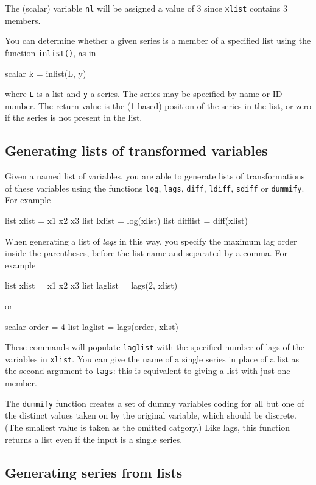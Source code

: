 The (scalar) variable \texttt{nl} will be assigned a value of 3 since
\texttt{xlist} contains 3 members.

You can determine whether a given series is a member of a specified
list using the function \texttt{inlist()}, as in
%
\begin{code}
scalar k = inlist(L, y)
\end{code}
%
where \texttt{L} is a list and \texttt{y} a series. The series may
be specified by name or ID number. The return value is the (1-based)
position of the series in the list, or zero if the series is not
present in the list. 

\subsection{Generating lists of transformed variables}

Given a named list of variables, you are able to generate lists of
transformations of these variables using the functions \texttt{log},
\texttt{lags}, \texttt{diff}, \texttt{ldiff}, \texttt{sdiff} or
\texttt{dummify}.  For example
%
\begin{code}
list xlist = x1 x2 x3
list lxlist = log(xlist)
list difflist = diff(xlist)
\end{code}

When generating a list of \textit{lags} in this way, you specify the
maximum lag order inside the parentheses, before the list name and
separated by a comma.  For example
%
\begin{code}
list xlist = x1 x2 x3
list laglist = lags(2, xlist)
\end{code}
%
or
%
\begin{code}
scalar order = 4
list laglist = lags(order, xlist)
\end{code}

These commands will populate \texttt{laglist} with the specified
number of lags of the variables in \texttt{xlist}.  You can give the
name of a single series in place of a list as the second argument to
\texttt{lags}: this is equivalent to giving a list with just one
member.

The \texttt{dummify} function creates a set of dummy variables coding
for all but one of the distinct values taken on by the original
variable, which should be discrete.  (The smallest value is taken as
the omitted catgory.)  Like lags, this function returns a list even if
the input is a single series.


\subsection{Generating series from lists}

